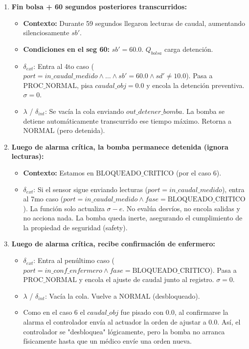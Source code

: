 \begin{itemize}
\begin{enumerate}
        \item \textbf{Fin bolsa + 60 segundos posteriores transcurridos:}
        \begin{itemize}
            \item \textbf{Contexto:} Durante 59 segundos llegaron lecturas de caudal, aumentando silenciosamente $sb'$.
            \item \textbf{Condiciones en el seg 60:} $sb' = 60.0$. $Q_{bolsa}$ carga detención.
            \item $\delta_{ext}$: Entra al 4to caso ($port = in\_caudal\_medido \land \dots \land sb' = 60.0 \land sd' \neq 10.0$). Pasa a $\text{PROC\_NORMAL}$, pisa $caudal\_obj = 0.0$ y encola la detención preventiva. $\sigma = 0$.
            \item $\lambda$ / $\delta_{int}$: Se vacía la cola enviando $out\_detener\_bomba$. La bomba se detiene automáticamente transcurrido ese tiempo máximo. Retorna a $\text{NORMAL}$ (pero detenida).
        \end{itemize}

        \item \textbf{Luego de alarma crítica, la bomba permanece detenida (ignora lecturas):}
        \begin{itemize}
            \item \textbf{Contexto:} Estamos en $\text{BLOQUEADO\_CRITICO}$ (por el caso 6).
            \item $\delta_{ext}$: Si el sensor sigue enviando lecturas ($port = in\_caudal\_medido$), entra al 7mo caso ($port = in\_caudal\_medido \land fase = \text{BLOQUEADO\_CRITICO}$). La función solo actualiza $\sigma - e$. No evalúa desvíos, no encola salidas y no acciona nada. La bomba queda inerte, asegurando el cumplimiento de la propiedad de seguridad (safety).
        \end{itemize}

        \item \textbf{Luego de alarma crítica, recibe confirmación de enfermero:}
        \begin{itemize}
            \item $\delta_{ext}$: Entra al penúltimo caso ($port = in\_conf\_enfermero \land fase = \text{BLOQUEADO\_CRITICO}$). Pasa a $\text{PROC\_NORMAL}$ y encola el ajuste de caudal junto al registro. $\sigma = 0$.
            \item $\lambda$ / $\delta_{int}$: Vacía la cola. Vuelve a $\text{NORMAL}$ (desbloqueado).
            \item Como en el caso 6 el $caudal\_obj$ fue pisado con $0.0$, al confirmarse la alarma el controlador envía al actuador la orden de ajustar a $0.0$. Así, el controlador se "desbloquea" lógicamente, pero la bomba no arranca físicamente hasta que un médico envíe una orden nueva.
        \end{itemize}


\end{enumerate}
\end{itemize}
